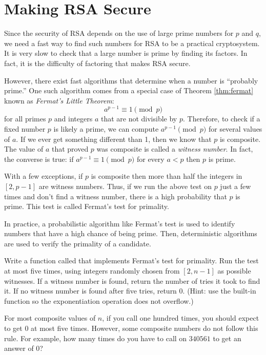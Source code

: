 \section*{Making RSA Secure}

Since the security of RSA depends on the use of large prime numbers for $p$ and $q$, we need a fast way to find such numbers for RSA to be a practical cryptosystem.
It is very slow to check that a large number is prime by finding its factors.
In fact, it is the difficulty of factoring that makes RSA secure.

However, there exist fast algorithms that determine when a number is ``probably prime.''
One such algorithm comes from a special case of Theorem \ref{thm:fermat} known as \emph{Fermat's Little Theorem}:
\[
a^{p-1} \equiv 1 \pmod{p}
\]
for all primes $p$ and integers $a$ that are not divisible by $p$.
Therefore, to check if a fixed number $p$ is likely a prime, we can compute $a^{p-1} \pmod{p}$ for several values of $a$.
If we ever get something different than 1, then we know that $p$ is composite.
The value of $a$ that proved $p$ was composite is called a \emph{witness number}.
In fact, the converse is true: if $a^{p-1} \equiv 1 \pmod{p}$ for every $a<p$ then $p$ is prime.

With a few exceptions, if $p$ is composite then more than half the integers in $[2, p-1]$ are witness numbers.
Thus, if we run the above test on $p$ just a few times and don't find a witness number, there is a high probability that $p$ is prime.
This test is called Fermat's test for primality.

In practice, a probabilistic algorithm like Fermat's test is used to identify numbers that have a high chance of being prime. 
Then, deterministic algorithms are used to verify the primality of a candidate.

\begin{problem}
Write a function called  that implements Fermat's test for primality.
Run the test at most five times, using integers randomly chosen from $[2, n-1]$ as possible witnesses.
If a witness number is found, return the number of tries it took to find it.
If no witness number is found after five tries, return $0$.
(Hint: use the built-in  function so the exponentiation operation does not overflow.)

For most composite values of $n$, if you call  one hundred times, you should expect to get $0$ at most five times.
However, some composite numbers do not follow this rule. 
For example, how many times do you have to call  on $340561$ to get an answer of $0$?
\label{prob:prime_confidence}
\end{problem}

